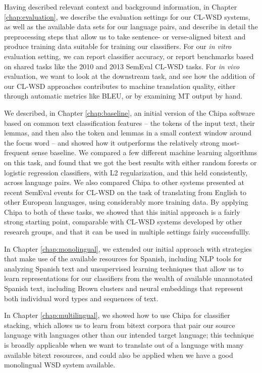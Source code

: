 Having described relevant context and background information, in Chapter
\ref{chap:evaluation}, we describe the evaluation settings for our CL-WSD
systems, as well as the available data sets for our language pairs, and
describe in detail the preprocessing steps that allow us to take sentence- or
verse-aligned bitext and produce training data suitable for training our
classifiers. For our \emph{in vitro} evaluation setting, we can report
classifier accuracy, or report benchmarks based on shared tasks like the 2010
and 2013 SemEval CL-WSD tasks. For \emph{in vivo} evaluation, we want to look
at the downstream task, and see how the addition of our CL-WSD approaches
contributes to machine translation quality, either through automatic metrics
like BLEU, or by examining MT output by hand.

We described, in Chapter \ref{chap:baseline}, an initial version of the Chipa
software based on common text classification features -- the tokens of the
input text, their lemmas, and then also the token and lemmas in a small context
window around the focus word -- and showed how it outperforms the relatively
strong most-frequent sense baseline. We compared a few different machine
learning algorithms on this task, and found that we got the best results with
either random forests or logistic regression classifiers, with L2
regularization, and this held consistently, across language pairs.
We also compared Chipa to other systems presented at recent SemEval events for
CL-WSD on the task of translating from English to other European languages,
using considerably more training data. By applying Chipa to both of these
tasks, we showed that this initial approach is a fairly strong starting point,
comparable with CL-WSD systems developed by other research groups, and that it
can be used in multiple settings fairly successfullly.

In Chapter \ref{chap:monolingual}, we extended our initial approach with
strategies that make use of the available resources for Spanish, including NLP
tools for analyzing Spanish text and unsupervised learning techniques that
allow us to learn representations for our classifiers from the wealth of
available unannotated Spanish text, including Brown clusters and neural
embeddings that represent both individual word types and sequences of text.

In Chapter \ref{chap:multilingual}, we showed how to use Chipa for classifier
stacking, which allows us to learn from bitext corpora that pair our source
language with languages other than our intended target language; this technique
is broadly applicable when we want to translate out of a language with many
available bitext resources, and could also be applied when we have a good
monolingual WSD system available.

